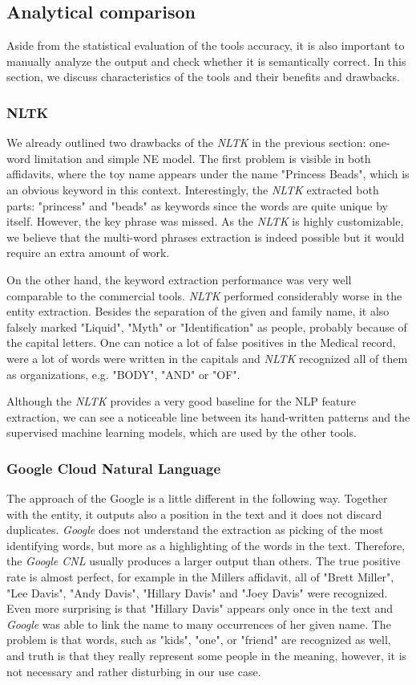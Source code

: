 \documentclass[
  digital, %
  notable,   %
  nolof,     %
  nolot,     %
  draft
]{fithesis3}
\begin{document}
\subsection{Analytical comparison}
Aside from the statistical evaluation of the tools accuracy, it is also important to manually analyze the output and check whether it is semantically correct.
In this section, we discuss characteristics of the tools and their benefits and drawbacks.

\subsubsection{\textbf{NLTK}}
We already outlined two drawbacks of the \textit{NLTK} in the previous section: one-word limitation and simple NE model.
The first problem is visible in both affidavits, where the toy name appears under the name "Princess Beads", which is an obvious keyword in this context.
Interestingly, the \textit{NLTK} extracted both parts: "princess" and "beads" as keywords since the words are quite unique by itself.
However, the key phrase was missed.
As the \textit{NLTK} is highly customizable, we believe that the multi-word phrases extraction is indeed possible but it would require an extra amount of work.

On the other hand, the keyword extraction performance was very well comparable to the commercial tools.
\textit{NLTK} performed considerably worse in the entity extraction.
Besides the separation of the given and family name, it also falsely marked "Liquid", "Myth" or "Identification" as people, probably because of the capital letters.
One can notice a lot of false positives in the Medical record, were a lot of words were written in the capitals and \textit{NLTK} recognized all of them as organizations, e.g. "BODY", "AND" or "OF".

Although the \textit{NLTK} provides a very good baseline for the NLP feature extraction, we can see a noticeable line between its hand-written patterns and the supervised machine learning models, which are used by the other tools.

\subsubsection{\textbf{Google Cloud Natural Language}}
The approach of the Google is a little different in the following way.
Together with the entity, it outputs also a position in the text and it does not discard duplicates.
\textit{Google} does not understand the extraction as picking of the most identifying words, but more as a highlighting of the words in the text.
Therefore, the \textit{Google CNL} usually produces a larger output than others.
The true positive rate is almost perfect, for example in the Millers affidavit, all of "Brett Miller", "Lee Davis", "Andy Davis", "Hillary Davis" and "Joey Davis" were recognized.
Even more surprising is that "Hillary Davis" appears only once in the text and \textit{Google} was able to link the name to many occurrences of her given name.
The problem is that words, such as "kids", "one", or "friend" are recognized as well, and truth is that they really represent some people in the meaning, however, it is not necessary and rather disturbing in our use case.
\end{document}

